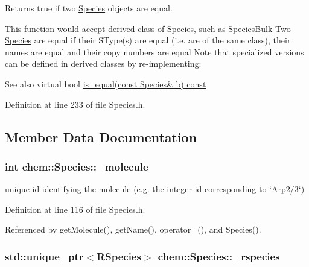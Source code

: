 Returns true if two \hyperlink{classchem_1_1Species}{Species} objects are equal. 

This function would accept derived class of \hyperlink{classchem_1_1Species}{Species}, such as \hyperlink{classchem_1_1SpeciesBulk}{Species\-Bulk} Two \hyperlink{classchem_1_1Species}{Species} are equal if their S\-Type(s) are equal (i.\-e. are of the same class), their names are equal and their copy numbers are equal Note that specialized versions can be defined in derived classes by re-\/implementing\-: \begin{DoxySeeAlso}{See also}
virtual bool \hyperlink{classchem_1_1Species_ac01be786c36974eb1e288b1bfdbf02f2}{is\-\_\-equal(const Species\& b) const } 
\end{DoxySeeAlso}


Definition at line 233 of file Species.\-h.



\subsection{Member Data Documentation}
\hypertarget{classchem_1_1Species_afc69264ab4c24ac17b7d1946b1b380f4}{
\subsubsection[{\-\_\-molecule}]{\setlength{\rightskip}{0pt plus 5cm}int {\bf chem\-::\-Species\-::\-\_\-molecule}}}\label{classchem_1_1Species_afc69264ab4c24ac17b7d1946b1b380f4}


unique id identifying the molecule (e.\-g. the integer id corresponding to \char`\"{}\-Arp2/3\char`\"{}) 



Definition at line 116 of file Species.\-h.



Referenced by get\-Molecule(), get\-Name(), operator=(), and Species().

\hypertarget{classchem_1_1Species_ae6e8e6ad9e05b4eb3f28cf20249caa67}{
\subsubsection[{\-\_\-rspecies}]{\setlength{\rightskip}{0pt plus 5cm}std\-::unique\-\_\-ptr$<${\bf R\-Species}$>$ {\bf chem\-::\-Species\-::\-\_\-rspecies}}}\label{classchem_1_1Species_ae6e8e6ad9e05b4eb3f28cf20249caa67}


